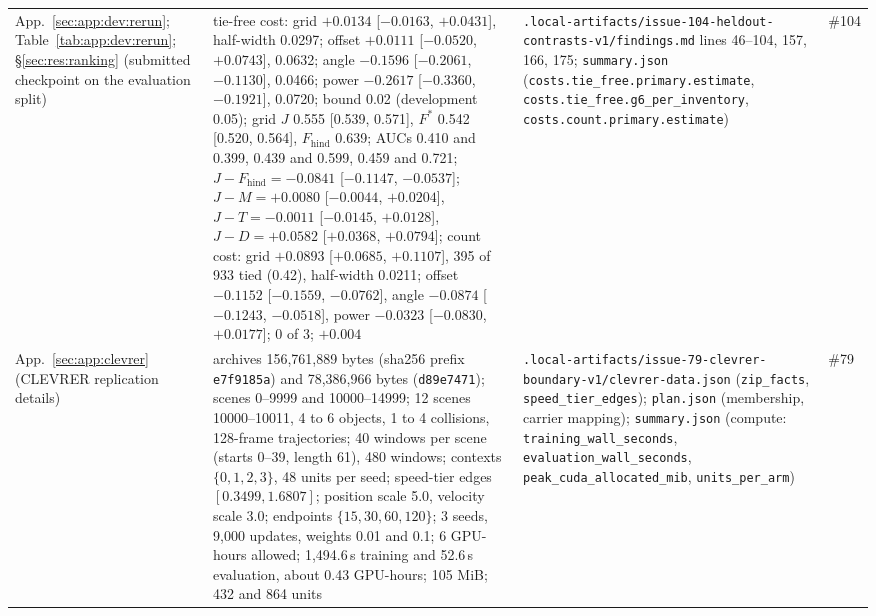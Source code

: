 {\begin{revblock}
\begin{longtable}{@{}>{\raggedright\arraybackslash}p{}>{\raggedright\arraybackslash}p{}>{\raggedright\arraybackslash}p{}>{\raggedright\arraybackslash}p{}@{}}
App.~\ref{sec:app:dev:rerun}; Table~\ref{tab:app:dev:rerun}; \S\ref{sec:res:ranking} (submitted checkpoint on the evaluation split) & tie-free cost: grid $+0.0134$ [$-0.0163$, $+0.0431$], half-width 0.0297; offset $+0.0111$ [$-0.0520$, $+0.0743$], 0.0632; angle $-0.1596$ [$-0.2061$, $-0.1130$], 0.0466; power $-0.2617$ [$-0.3360$, $-0.1921$], 0.0720; bound 0.02 (development 0.05); grid $J$ 0.555 [0.539, 0.571], $F^{*}$ 0.542 [0.520, 0.564], $F_{\mathrm{hind}}$ 0.639; AUCs 0.410 and 0.399, 0.439 and 0.599, 0.459 and 0.721; $J-F_{\mathrm{hind}}=-0.0841$ [$-0.1147$, $-0.0537$]; $J-M=+0.0080$ [$-0.0044$, $+0.0204$], $J-T=-0.0011$ [$-0.0145$, $+0.0128$], $J-D=+0.0582$ [$+0.0368$, $+0.0794$]; count cost: grid $+0.0893$ [$+0.0685$, $+0.1107$], 395 of 933 tied (0.42), half-width 0.0211; offset $-0.1152$ [$-0.1559$, $-0.0762$], angle $-0.0874$ [$-0.1243$, $-0.0518$], power $-0.0323$ [$-0.0830$, $+0.0177$]; 0 of 3; $+0.004$ & \nolinkurl{.local-artifacts/issue-104-heldout-contrasts-v1/findings.md} lines 46--104, 157, 166, 175; \nolinkurl{summary.json} (\nolinkurl{costs.tie_free.primary.estimate}, \nolinkurl{costs.tie_free.g6_per_inventory}, \nolinkurl{costs.count.primary.estimate}) & \#104 \\
App.~\ref{sec:app:clevrer} (CLEVRER replication details) & archives 156,761,889 bytes (sha256 prefix \texttt{e7f9185a}) and 78,386,966 bytes (\texttt{d89e7471}); scenes 0--9999 and 10000--14999; 12 scenes 10000--10011, 4 to 6 objects, 1 to 4 collisions, 128-frame trajectories; 40 windows per scene (starts 0--39, length 61), 480 windows; contexts $\{0,1,2,3\}$, 48 units per seed; speed-tier edges $[0.3499, 1.6807]$; position scale 5.0, velocity scale 3.0; endpoints $\{15,30,60,120\}$; 3 seeds, 9,000 updates, weights 0.01 and 0.1; 6 GPU-hours allowed; 1,494.6\,s training and 52.6\,s evaluation, about 0.43 GPU-hours; 105 MiB; 432 and 864 units & \nolinkurl{.local-artifacts/issue-79-clevrer-boundary-v1/clevrer-data.json} (\nolinkurl{zip_facts}, \nolinkurl{speed_tier_edges}); \nolinkurl{plan.json} (membership, carrier mapping); \nolinkurl{summary.json} (compute: \nolinkurl{training_wall_seconds}, \nolinkurl{evaluation_wall_seconds}, \nolinkurl{peak_cuda_allocated_mib}, \nolinkurl{units_per_arm}) & \#79 \\

\end{longtable}
\end{revblock}}
